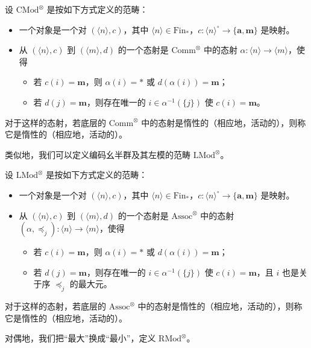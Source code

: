 \begin{definition}\label{L21-2.5}
设 $\mathrm{CMod}^{\otimes}$ 是按如下方式定义的范畴：
\begin{itemize}[leftmargin=2.2em,itemsep=0.1em]
\item 一个对象是一个对 $(\langle n\rangle,c)$，其中 $\langle n\rangle\in\mathrm{Fin}_{*}$，$c\colon\langle n\rangle^{\circ}\to\{\mathbf{a},\mathbf{m}\}$ 是映射。
\item 从 $(\langle n\rangle,c)$ 到 $(\langle m\rangle,d)$ 的一个态射是 $\mathrm{Comm}^{\otimes}$ 中的态射 $\alpha\colon\langle n\rangle\to\langle m\rangle$，使得
\begin{itemize}[leftmargin=1.9em,itemsep=0.05em]
\item 若 $c(i)=\mathbf{m}$，则 $\alpha(i)=*$ 或 $d(\alpha(i))=\mathbf{m}$；
\item 若 $d(j)=\mathbf{m}$，则存在唯一的 $i\in\alpha^{-1}(\{j\})$ 使 $c(i)=\mathbf{m}$。
\end{itemize}
\end{itemize}
对于这样的态射，若底层的 $\mathrm{Comm}^{\otimes}$ 中的态射是惰性的（相应地，活动的），则称它是惰性的（相应地，活动的）。
\end{definition}

\nitem\label{L21-2.6} 类似地，我们可以定义编码幺半群及其左模的范畴 $\mathrm{LMod}^{\otimes}$。

\begin{definition}\label{L21-2.7}
设 $\mathrm{LMod}^{\otimes}$ 是按如下方式定义的范畴：
\begin{itemize}[leftmargin=2.2em,itemsep=0.1em]
\item 一个对象是一个对 $(\langle n\rangle,c)$，其中 $\langle n\rangle\in\mathrm{Fin}_{*}$，$c\colon\langle n\rangle^{\circ}\to\{\mathbf{a},\mathbf{m}\}$ 是映射。
\item 从 $(\langle n\rangle,c)$ 到 $(\langle m\rangle,d)$ 的一个态射是 $\mathrm{Assoc}^{\otimes}$ 中的态射 $(\alpha,\preceq_j)\colon\langle n\rangle\to\langle m\rangle$，使得
\begin{itemize}[leftmargin=1.9em,itemsep=0.05em]
\item 若 $c(i)=\mathbf{m}$，则 $\alpha(i)=*$ 或 $d(\alpha(i))=\mathbf{m}$；
\item 若 $d(j)=\mathbf{m}$，则存在唯一的 $i\in\alpha^{-1}(\{j\})$ 使 $c(i)=\mathbf{m}$，且 $i$ 也是关于序 $\preceq_j$ 的最大元。
\end{itemize}
\end{itemize}
对于这样的态射，若底层的 $\mathrm{Assoc}^{\otimes}$ 中的态射是惰性的（相应地，活动的），则称它是惰性的（相应地，活动的）。

对偶地，我们把“最大”换成“最小”，定义 $\mathrm{RMod}^{\otimes}$。
\end{definition}

